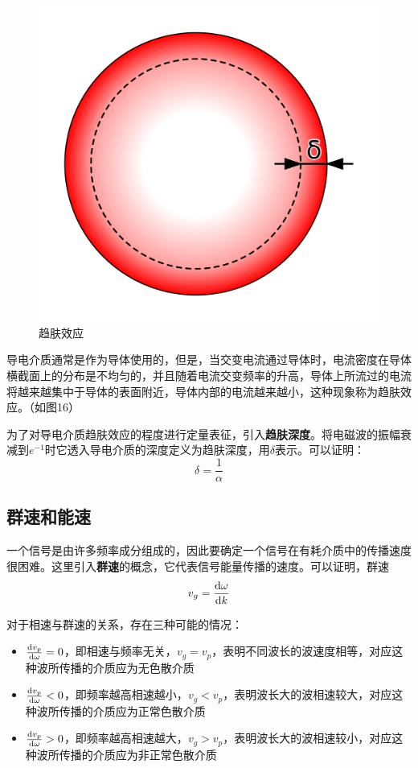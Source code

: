\documentclass[UTF8,a4paper,11pt]{article}
\begin{document}
\begin{figure}[htbp]
\centering
\includegraphics[scale=0.15]{p16.png}
\caption{趋肤效应}
\end{figure}

导电介质通常是作为导体使用的，但是，当交变电流通过导体时，电流密度在导体横截面上的分布是不均匀的，并且随着电流交变频率的升高，导体上所流过的电流将越来越集中于导体的表面附近，导体内部的电流越来越小，这种现象称为趋肤效应。（如图16）

为了对导电介质趋肤效应的程度进行定量表征，引入\textbf{趋肤深度}。将电磁波的振幅衰减到$e^{-1}$时它透入导电介质的深度定义为趋肤深度，用$\delta$表示。可以证明：
\begin{equation}
\delta=\frac{1}{\alpha}
\end{equation}

\subsection{群速和能速}
一个信号是由许多频率成分组成的，因此要确定一个信号在有耗介质中的传播速度很困难。这里引入\textbf{群速}的概念，它代表信号能量传播的速度。可以证明，群速
\begin{equation}
v_g=\frac{{\rm d}\omega}{{\rm d}k}
\end{equation}

对于相速与群速的关系，存在三种可能的情况：
\begin{itemize}
\item $\frac{{\rm d}v_p}{{\rm d}\omega}=0$，即相速与频率无关，$v_g=v_p$，表明不同波长的波速度相等，对应这种波所传播的介质应为无色散介质
\item $\frac{{\rm d}v_p}{{\rm d}\omega}<0$，即频率越高相速越小，$v_g<v_p$，表明波长大的波相速较大，对应这种波所传播的介质应为正常色散介质
\item $\frac{{\rm d}v_p}{{\rm d}\omega}>0$，即频率越高相速越大，$v_g>v_p$，表明波长大的波相速较小，对应这种波所传播的介质应为非正常色散介质
\end{itemize}
\end{document}
